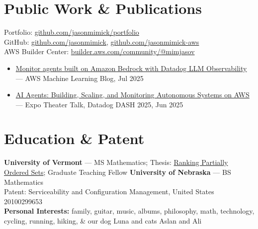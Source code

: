 \documentclass[10pt,letterpaper]{article}
\begin{document}
\section{Public Work \& Publications}
{\small
Portfolio: \href{https://github.com/jasonmimick/portfolio}{github.com/jasonmimick/portfolio}\\
GitHub: \href{https://github.com/jasonmimick}{github.com/jasonmimick}, \href{https://github.com/jasonmimick-aws}{github.com/jasonmimick-aws}\\
AWS Builder Center: \href{https://builder.aws.com/community/@mimjasov?tab=articles}{builder.aws.com/community/@mimjasov}}
\begin{itemize}
\item {\small \href{https://aws.amazon.com/blogs/machine-learning/monitor-agents-built-on-amazon-bedrock-with-datadog-llm-observability/}{Monitor agents built on Amazon Bedrock with Datadog LLM Observability} --- AWS Machine Learning Blog, Jul 2025}
\item {\small \href{https://dash.datadoghq.com/2025/speakers/jason-mimick}{AI Agents: Building, Scaling, and Monitoring Autonomous Systems on AWS} --- Expo Theater Talk, Datadog DASH 2025, Jun 2025}
\end{itemize}

\section{Education \& Patent}
{\small\textbf{University of Vermont} --- MS Mathematics; Thesis: \href{https://web.archive.org/web/20251230112235/https://citeseerx.ist.psu.edu/viewdoc/download?doi=10.1.1.28.2960&rep=rep1&type=pdf}{Ranking Partially Ordered Sets}; Graduate Teaching Fellow \enspace\textbar\enspace \textbf{University of Nebraska} --- BS Mathematics\\
Patent: Serviceability and Configuration Management, United States 20100299653\\
\textbf{\color{accent}Personal Interests:} family, guitar, music, albums, philosophy, math, technology, cycling, running, hiking, \& our dog Luna and cats Aslan and Ali}
\end{document}
